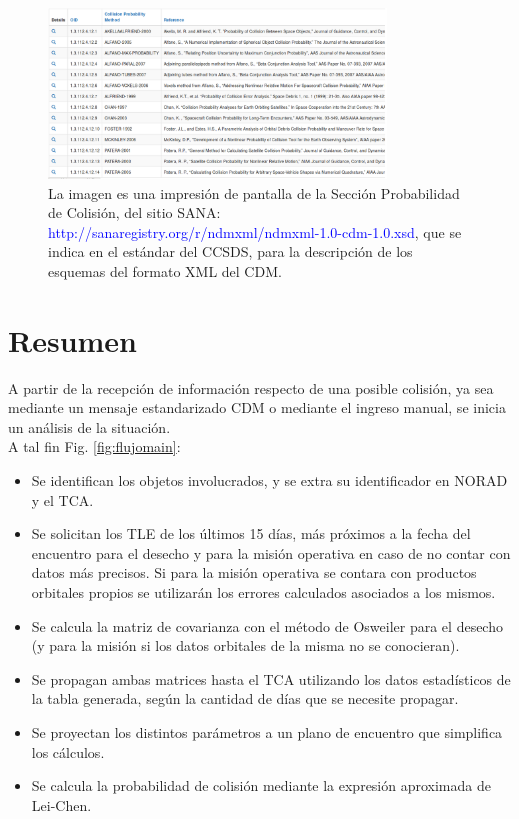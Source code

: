 {\begin{figure}[!h]
\centering
\includegraphics[width=0.8\textwidth]{imagenes/sanaPoCmetodos}
\caption[M\'etodos de c\'alculo de PoC - (Sitio Web SANA)]{ La imagen es una impresi\'on de pantalla de la Secci\'on Probabilidad de Colisi\'on, del sitio SANA: \textcolor{blue}{http://sanaregistry.org/r/ndmxml/ndmxml-1.0-cdm-1.0.xsd}, que se indica en el est\'andar del CCSDS, para la descripci\'on de los esquemas del formato XML del CDM.}
\label{fig:pagsana}
\end{figure}

\section*{Resumen}
A partir de la recepci\'on de informaci\'on respecto de una posible colisi\'on, ya sea mediante un mensaje estandarizado CDM o mediante el ingreso manual, se inicia un an\'alisis de la situaci\'on.\\
A tal fin Fig. \ref{fig:flujomain}:\\
\begin{itemize}
\itemsep0em
\item Se identifican los objetos involucrados, y se extra su identificador en NORAD y el TCA.
\item Se solicitan los TLE de los \'ultimos 15 d\'ias, m\'as pr\'oximos a la fecha del encuentro para el desecho y para la misi\'on operativa en caso de no contar con datos m\'as precisos. Si para la misi\'on operativa se contara con productos orbitales propios se utilizar\'an los errores calculados asociados a los mismos.
\item Se calcula la matriz de covarianza con el m\'etodo de Osweiler para el desecho (y para la misi\'on si los datos orbitales de la misma no se conocieran).
\item Se propagan ambas matrices hasta el TCA utilizando los datos estad\'isticos de la tabla generada, seg\'un la cantidad de d\'ias que se necesite propagar.
\item Se proyectan los distintos par\'ametros a un plano de encuentro que simplifica los c\'alculos.
\item Se calcula la probabilidad de colisi\'on mediante la expresi\'on aproximada de Lei-Chen.
\end{itemize}

}
